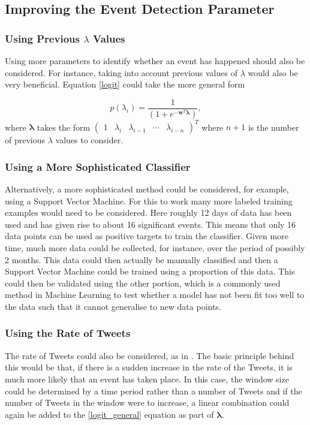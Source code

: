 \documentclass[11pt,a4paper]{article}
\begin{document}
\subsection{Improving the Event Detection Parameter}
\subsubsection{Using Previous $\lambda$ Values}
Using more parameters to identify whether an event has happened should also be considered. For instance, taking into account previous values of $\lambda$ would also be very beneficial. Equation \eqref{logit} could take the more general form

\begin{equation}
p(\lambda_i)= \frac{1}{\left( 1 + e^{-\mathbf{w}^T\bm{\lambda}}\right)},
\label{logit_general}
\end{equation}
where $\bm{\lambda}$ takes the form $\left(\begin{matrix}
1 & \lambda_i & \lambda_{i-1} & \cdots & \lambda_{i-n}
\end{matrix}\right)^T$ where $n+1$ is the number of previous $\lambda$ values to consider. 

\subsubsection{Using a More Sophisticated Classifier}
Alternatively, a more sophisticated method could be considered, for example, using a Support Vector Machine. For this to work many more labeled training examples would need to be considered. Here roughly 12 days of data has been used and has given rise to about 16 significant events. This means that only 16 data points can be used as positive targets to train the classifier. Given more time, much more data could be collected, for instance, over the period of possibly 2 months. This data could then actually be manually classified and then a Support Vector Machine could be trained using a proportion of this data. This could then be validated using the other portion, which is a commonly used method in Machine Learning to test whether a model has not been fit too well to the data such that it cannot generalise to new data points.

\subsubsection{Using the Rate of Tweets}
The rate of Tweets could also be considered, as in \cite{microblogs}. The basic principle behind this would be that, if there is a sudden increase in the rate of the Tweets, it is much more likely that an event has taken place. In this case, the window size could be determined by a time period rather than a number of Tweets and if the number of Tweets in the window were to increase, a linear combination could again be added to the \eqref{logit_general} equation as part of $\bm{\lambda}$.
\end{document}
